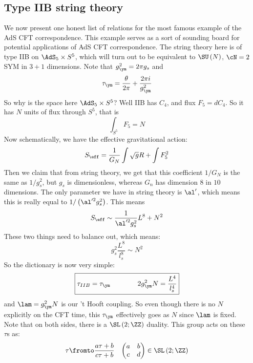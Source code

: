 \documentclass{booc}
\begin{document}
\subsection{Type IIB string theory}

We now present one honest list of relations for the most famous example of the AdS CFT
correspondence. This example serves as a sort of sounding board for potential applications
of AdS CFT correspondence.
The string theory here is of
type IIB on $\AdS_5\times S^5$, 
which will turn out to be equivalent to 
$\SU\left( N \right)$,
$\cN = 2$ SYM in $3+1$ dimensions. 
Note that $g_{\ym}^2 = 2\pi g_s$ and
\begin{equation}
\tau_\ym = 
\frac{\theta}{2\pi}
+ \frac{2\pi i }{ g_\ym^2}
\end{equation}
So why is the space here $\AdS_5\times S^5$?
Well IIB has $C_4$, 
and flux $F_5 = d C_4$.
So it has $N$ units of flux through $S^5$, that is
\begin{equation}
\int_{S^5} F_5 =  N
\end{equation}
Now schematically, we have the effective gravitational action:
\begin{align}
S_\eff =
\frac{1}{G_N}\int \sqrt{g}R + 
\int F_5^2
\end{align}
Then we claim that from string theory, we get that this coefficient $1/G_N$
is the same as $1 / g_s^2$, but $g_s$ is dimensionless, 
whereas $G_n$ has dimension $8$ in $10$ dimensions. 
The only parameter we have in string theory is $\al'$, which means this is really equal to
$1 / \left( \al'^2 g_s^2 \right)$. This means
\begin{equation}
S_\eff \sim
\frac{1}{\al'^2 g_s^2} L^8 + N^2
\end{equation}
These two things need to balance out, which means:
\begin{equation}
g_s^2 \frac{L^8}{l_s^8}\sim N^2
\end{equation}
So the dictionary is now very simple:
\begin{equation}
\boxed{
\tau_{IIB} = \tau_\ym
\qquad\qquad
2 g_\ym^2 N = 
\frac{L^4}{l_s^4}}
\end{equation}
and $\lam = g_\ym^2 N$ is our 't Hooft coupling.
So even though there is no $N$ 
explicitly on the CFT time, this $\tau_\ym$ effectively goes as $N$ since $\lam$ is fixed. 
Note that on both sides, there is a $\SL\left( 2 ; \ZZ \right)$ duality.
This group acts on these $\tau$s as:
\begin{align}
\tau \fromto \frac{a \tau + b}{c\tau + b}
&&
\begin{pmatrix}
a & b \\ c & d
\end{pmatrix}\in \SL\left( 2 ; \ZZ \right)
\end{align}
\end{document}
